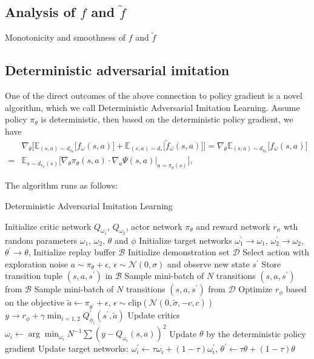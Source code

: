 \subsection{Analysis of $f$ and $\tilde{f}$}
Monotonicity and smoothness of $f$ and $\tilde{f}$


\subsection{Deterministic adversarial imitation}
One of the direct outcomes of the above connection to policy gradient is a novel algorithm, which we call Deterministic Adversarial Imitation Learning. 
Assume policy $\pi_{\theta}$ is deterministic, then based on the deterministic policy gradient, we have
\begin{align*}
& \nabla_{\theta} \Big[ \mathbb{E}_{(s, a)\sim d_{\pi_{\theta}}} \big[ f_{\omega}(s, a) \big] + \mathbb{E}_{(s, a)\sim d_*} \big[ \tilde{f}_{\omega}(s, a) \big] \Big] 
= \nabla_{\theta} \mathbb{E}_{(s, a)\sim d_{\pi_{\theta}}} \big[ f_{\omega}(s, a) \big] \\ 
= & \mathbb{E}_{s\sim d_{\pi_{\theta}}(s)} \big[  \nabla_\theta \pi_{\theta}(s, a) \cdot \nabla_a \Psi(s, a)\big|_{a=\pi_{\theta}(s)}\big], 
\end{align*}

The algorithm runs as follows:

\begin{algorithm}
\caption{Deterministic Adversarial Imitation Learning}
\begin{algorithmic}[1] %
\STATE Initialize critic network $Q_{\omega_1}$, $Q_{\omega_2}$, actor network $\pi_{\theta}$ and reward network $r_{\phi}$ wth random parameters $\omega_1$, $\omega_2$, $\theta$ and $\phi$
\STATE Initialize target networks $\omega_1^\prime\rightarrow\omega_1$, $\omega_2^\prime\rightarrow\omega_2$, $\theta^\prime\rightarrow\theta$,
\STATE Initialize replay buffer $\mathcal{B}$
\STATE Initialize demonstration set $\mathcal{D}$
\STATE Select action with exploration noise $a\sim\pi_{\theta} + \epsilon$, $\epsilon\sim \mathcal{N}(0, \sigma)$ and observe new state $s^\prime$
\STATE Store transition tuple $(s, a, s^\prime)$ in $\mathcal{B}$
\STATE Sample mini-batch of $N$ transitions $(s, a, s^\prime)$ from $\mathcal{B}$
\STATE Sample mini-batch of $N$ transitions $(s, a, s^\prime)$ from $\mathcal{D}$
\STATE Optimize $r_{\phi}$ based on the objective
\ENDIF
\STATE $\tilde{a} \leftarrow \pi_{\theta^\prime}+\epsilon$, $\epsilon\sim \text{clip}(\mathcal{N}(0, \tilde{\sigma}, -c, c))$
\STATE $y\rightarrow r_{\phi}+\gamma \min_{i=1, 2}Q_{\phi_i}^\prime(s^\prime, \tilde{a})$
\STATE Update critics $\omega_i\leftarrow \arg\min_{\omega_i} N^{-1}\sum(y - Q_{\omega_i}(s, a))^2$
\STATE Update $\theta$ by the deterministic policy gradient
\STATE Update target networks: $\omega_i^\prime\leftarrow \tau \omega_i + (1-\tau)\omega_i^\prime$, $\theta^\prime \leftarrow \tau \theta + (1-\tau)\theta $
\ENDIF
\ENDFOR
\end{algorithmic}
\end{algorithm}
